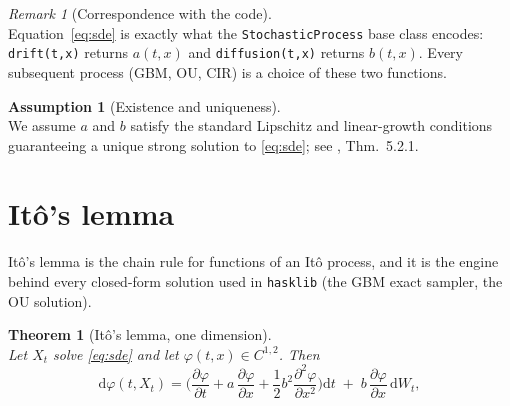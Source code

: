\documentclass[11pt]{report}
\newcommand{\dd}{\mathrm{d}}
\newcommand{\dW}{\dd W_t}
\newcommand{\dt}{\dd t}
\newcommand{\drift}{a}
\newcommand{\diff}{b}
\theoremstyle{plain}
\newtheorem{theorem}{Theorem}[chapter]
\theoremstyle{definition}
\newtheorem{assumption}{Assumption}[chapter]
\theoremstyle{remark}
\newtheorem{remark}{Remark}[chapter]
\numberwithin{equation}{chapter}
\begin{document}
\begin{remark}[Correspondence with the code]
  \leavevmode\\
Equation~\eqref{eq:sde} is exactly what the \texttt{StochasticProcess}
base class encodes: \texttt{drift(t,x)} returns $\drift(t,x)$ and
\texttt{diffusion(t,x)} returns $\diff(t,x)$. Every subsequent
process (GBM, OU, CIR) is a choice of these two functions.
\end{remark}

\begin{assumption}[Existence and uniqueness]\label{ass:existence-uniqueness}
  \leavevmode\\
We assume $\drift$ and $\diff$ satisfy the standard Lipschitz and
linear-growth conditions guaranteeing a unique strong solution to
\eqref{eq:sde}; see , Thm.~5.2.1. 
\end{assumption}

\section{It\^o's lemma}

It\^o's lemma is the chain rule for functions of an It\^o process, and
it is the engine behind every closed-form solution used in
\texttt{hasklib} (the GBM exact sampler, the OU solution).

\begin{theorem}[It\^o's lemma, one dimension]\label{thm:ito}
\leavevmode\\
Let $X_t$ solve \eqref{eq:sde} and let $\varphi(t,x)\in C^{1,2}$. Then
\begin{equation}\label{eq:ito}
   \dd \varphi(t,X_t) =
     \Big( \frac{\partial\varphi}{\partial t} + \drift\, \frac{\partial\varphi}{\partial x} + \frac{1}{2} \diff^2 \frac{\partial^2\varphi}{\partial x^2} \Big)\dt
     \;+\; \diff\, \frac{\partial\varphi}{\partial x} \,\dW,
\end{equation}
\end{theorem}
\end{document}
